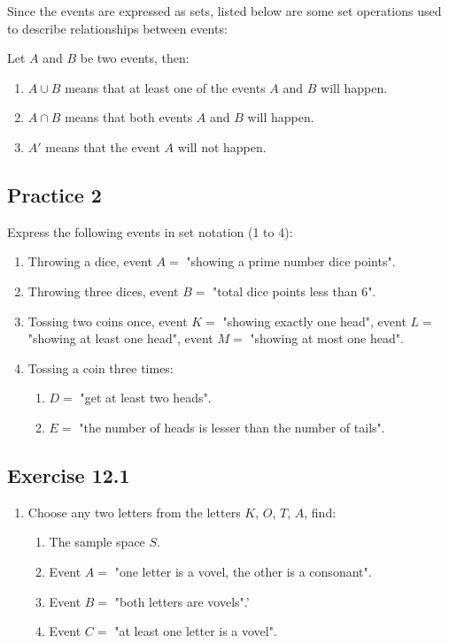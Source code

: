 \documentclass{report}
\begin{document}
\begin{multicols}{2}
  Since the events are expressed as sets, listed below are some set operations
  used to describe relationships between events:

  Let $A$ and $B$ be two events, then:

  \begin{enumerate}
    \item $A \cup B$ means that at least one of the events $A$ and $B$ will happen.

    \item $A \cap B$ means that both events $A$ and $B$ will happen.

    \item $A'$ means that the event $A$ will not happen.
  \end{enumerate}

  \subsection{Practice 2}

  Express the following events in set notation (1 to 4):
  \begin{enumerate}
    \item Throwing a dice, event $A = $ "showing a prime number dice points".

    \item Throwing three dices, event $B = $ "total dice points less than 6".

    \item Tossing two coins once, event $K = $ "showing exactly one head", event $L = $
          "showing at least one head", event $M = $ "showing at most one head".

    \item Tossing a coin three times:
          \begin{enumerate}
            \item $D = $ "get at least two heads".
            \item $E = $ "the number of heads is lesser than the number of tails".
          \end{enumerate}
  \end{enumerate}

  \subsection{Exercise 12.1}

  \begin{enumerate}
    \item Choose any two letters from the letters $K$, $O$, $T$, $A$, find:
          \begin{enumerate}
            \item The sample space $S$.
            \item Event $A = $ "one letter is a vovel, the other is a consonant".
            \item Event $B = $ "both letters are vovels".'
            \item Event $C = $ "at least one letter is a vovel".
          \end{enumerate}


\end{enumerate}
\end{multicols}
\end{document}
